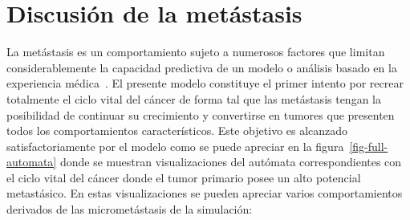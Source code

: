 \section{Discusi\'on de la met\'astasis}
\label{sec-metastasis-validation}
La met\'astasis es un comportamiento sujeto a numerosos factores que limitan considerablemente la capacidad predictiva de un modelo o an\'alisis basado en la experiencia m\'edica~\cite{robins}. El presente modelo constituye el primer intento por recrear totalmente el ciclo vital del c\'ancer de forma tal que las met\'astasis tengan la posibilidad de continuar su crecimiento y convertirse en tumores que presenten todos los comportamientos caracter\'isticos. Este objetivo es alcanzado satisfactoriamente por el modelo como se puede apreciar en la figura~\ref{fig-full-automata} donde se muestran visualizaciones del aut\'omata correspondientes con el ciclo vital del c\'ancer donde el tumor primario posee un alto potencial metast\'asico. En estas visualizaciones se pueden apreciar varios comportamientos derivados de las micromet\'astasis de la simulaci\'on:
